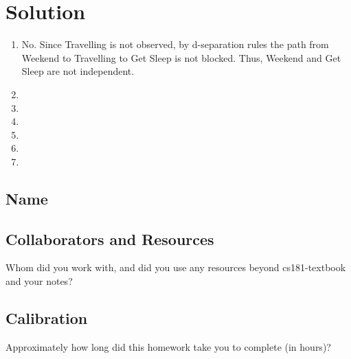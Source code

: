 \documentclass[submit]{harvardml}
\begin{document}
\newpage
\section*{Solution}
\begin{enumerate}
  \item No. Since Travelling is not observed, by d-separation rules the path from Weekend to Travelling to Get Sleep is not blocked. Thus, Weekend and Get Sleep are not independent.
  
  \item 
  \item 
  \item 
  \item 
  \item 
  \item 
\end{enumerate}

\newpage
\subsection*{Name}

\subsection*{Collaborators and Resources}
Whom did you work with, and did you use any resources beyond cs181-textbook and your notes?

\subsection*{Calibration}
Approximately how long did this homework take you to complete (in hours)? 
\end{document}
